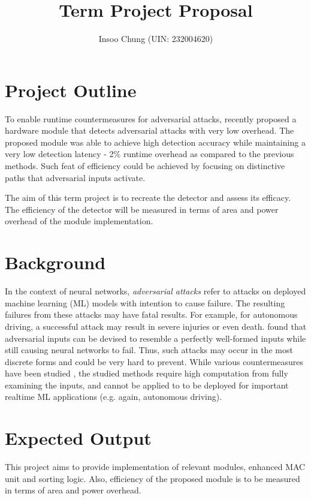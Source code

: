 \documentclass[11pt]{article}
\title{Term Project Proposal}
\author{Insoo Chung (UIN: 232004620)}
\begin{document}
\maketitle
\section{Project Outline}

To enable runtime countermeasures for adversarial attacks, \citet{ptolemy} recently proposed a hardware module that detects adversarial attacks with very low overhead.
The proposed module was able to achieve high detection accuracy while maintaining a very low detection latency - 2\% runtime overhead as compared to the previous methods.
Such feat of efficiency could be achieved by focusing on distinctive paths that adversarial inputs activate.

The aim of this term project is to recreate the detector and assess its efficacy.
The efficiency of the detector will be measured in terms of area and power overhead of the module implementation.

\section{Background}

In the context of neural networks, \textit{adversarial attacks} refer to attacks on deployed machine learning (ML) models with intention to cause failure.
The resulting failures from these attacks may have fatal results.
For example, for autonomous driving, a successful attack may result in severe injuries or even death.
\citet{szegedy2013intriguing} found that adversarial inputs can be devised to resemble a perfectly well-formed inputs while still causing neural networks to fail.
Thus, such attacks may occur in the most discrete forms and could be very hard to prevent.
While various countermeasures have been studied \cite{detected,ensembles}, the studied methods require high computation from fully examining the inputs, and cannot be applied to to be deployed for important realtime ML applications (e.g. again, autonomous driving).

\section{Expected Output}

This project aims to provide implementation of relevant modules, enhanced MAC unit and sorting logic.
Also, efficiency of the proposed module is to be measured in terms of area and power overhead.
\end{document}
